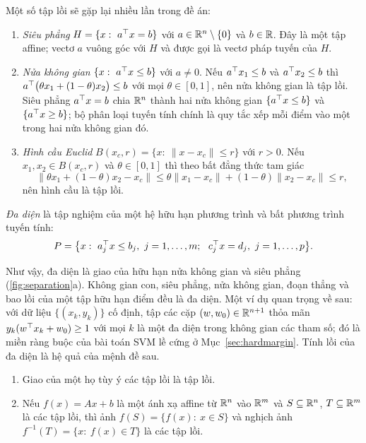 \begin{example}\label{ex:convex-sets}
Một số tập lồi sẽ gặp lại nhiều lần trong đề án:
\begin{enumerate}[label=(\alph*),leftmargin=2em]
\item \emph{Siêu phẳng} $H=\{x:\ a^\top x=b\}$ với $a\in\mathbb{R}^n\setminus\{0\}$ và $b\in\mathbb{R}$. Đây là một tập affine; vectơ $a$ vuông góc với $H$ và được gọi là vectơ pháp tuyến của $H$.
\item \emph{Nửa không gian} $\{x:\ a^\top x\le b\}$ với $a\neq0$. Nếu $a^\top x_1\le b$ và $a^\top x_2\le b$ thì $a^\top\bigl(\theta x_1+(1-\theta)x_2\bigr)\le b$ với mọi $\theta\in[0,1]$, nên nửa không gian là tập lồi. Siêu phẳng $a^\top x=b$ chia $\mathbb{R}^n$ thành hai nửa không gian $\{a^\top x\le b\}$ và $\{a^\top x\ge b\}$; bộ phân loại tuyến tính chính là quy tắc xếp mỗi điểm vào một trong hai nửa không gian đó.
\item \emph{Hình cầu Euclid} $B(x_c,r)=\{x:\ \|x-x_c\|\le r\}$ với $r>0$. Nếu $x_1,x_2\in B(x_c,r)$ và $\theta\in[0,1]$ thì theo bất đẳng thức tam giác
\[
\|\theta x_1+(1-\theta)x_2-x_c\|\le\theta\|x_1-x_c\|+(1-\theta)\|x_2-x_c\|\le r,
\]
nên hình cầu là tập lồi.
\end{enumerate}
\end{example}

\begin{definition}\label{def:polyhedron}
\emph{Đa diện} là tập nghiệm của một hệ hữu hạn phương trình và bất phương trình tuyến tính:
\begin{equation}\label{eq:polyhedron}
P=\bigl\{x:\ a_j^\T x\le b_j,\ j=1,\dots,m;\ \ c_j^\T x=d_j,\ j=1,\dots,p\bigr\}.
\end{equation}
\end{definition}

Như vậy, đa diện là giao của hữu hạn nửa không gian và siêu phẳng (\cref{fig:separation}a). Không gian con, siêu phẳng, nửa không gian, đoạn thẳng và bao lồi của một tập hữu hạn điểm đều là đa diện. Một ví dụ quan trọng về sau: với dữ liệu $\{(x_k,y_k)\}$ cố định, tập các cặp $(w,w_0)\in\mathbb{R}^{n+1}$ thỏa mãn $y_k(w^\top x_k+w_0)\ge1$ với mọi $k$ là một đa diện trong không gian các tham số; đó là miền ràng buộc của bài toán SVM lề cứng ở Mục~\ref{sec:hardmargin}. Tính lồi của đa diện là hệ quả của mệnh đề sau.

\begin{proposition}\label{prop:convex-ops}
\begin{enumerate}[label=(\roman*),leftmargin=2em]
\item Giao của một họ tùy ý các tập lồi là tập lồi.
\item Nếu $f(x)=Ax+b$ là một ánh xạ affine từ $\mathbb{R}^n$ vào $\mathbb{R}^m$ và $S\subseteq\mathbb{R}^n$, $T\subseteq\mathbb{R}^m$ là các tập lồi, thì ảnh $f(S)=\{f(x):\ x\in S\}$ và nghịch ảnh $f^{-1}(T)=\{x:\ f(x)\in T\}$ là các tập lồi.
\end{enumerate}
\end{proposition}

